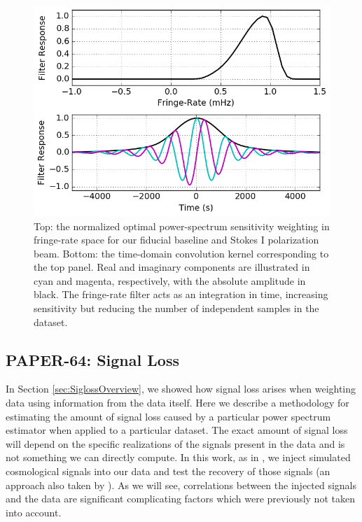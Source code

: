 \documentclass[preprint2,numberedappendix,tighten]{aastex6}  %
\begin{document}
\begin{figure}
	\centering
	\includegraphics[width=\columnwidth]{plots/frp.png}
	\caption{Top: the normalized optimal power-spectrum sensitivity weighting in fringe-rate space for our fiducial baseline and 
Stokes I polarization beam. Bottom: the time-domain convolution kernel corresponding to the top panel. Real and imaginary 
components are illustrated in cyan and magenta, respectively, with the absolute amplitude in black. The fringe-rate filter acts as 
an integration in time, increasing sensitivity but reducing the number of independent samples in the dataset.}
	\label{fig:frp}
\end{figure}


\subsection{PAPER-64: Signal Loss}
\label{sec:Sigloss}

In Section \ref{sec:SiglossOverview}, we showed how signal loss arises when weighting data using information from the data itself. Here we describe a methodology for estimating the amount of signal loss caused by a particular power spectrum estimator when applied to a particular dataset. The exact amount of signal loss will depend on the specific realizations of the signals present in the data and is not something we can directly compute. In this work, as in , we inject simulated cosmological signals into our data and test the recovery of those signals (an approach also taken by \citet{masui_et_al2013}). As we will see, correlations between the injected signals and the data are significant complicating factors which were previously not taken into account. 
\end{document}
